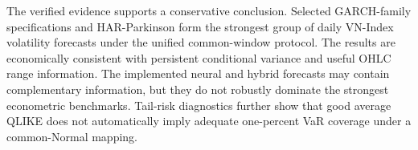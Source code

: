 The verified evidence supports a conservative conclusion. Selected GARCH-family specifications and HAR-Parkinson form the strongest group of daily VN-Index volatility forecasts under the unified common-window protocol. The results are economically consistent with persistent conditional variance and useful OHLC range information. The implemented neural and hybrid forecasts may contain complementary information, but they do not robustly dominate the strongest econometric benchmarks. Tail-risk diagnostics further show that good average QLIKE does not automatically imply adequate one-percent VaR coverage under a common-Normal mapping.

